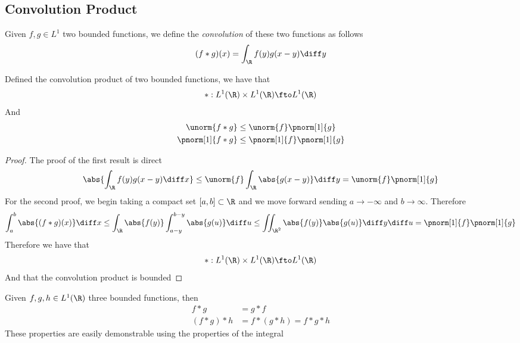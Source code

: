 \documentclass[../mmf.tex]{subfiles}
\begin{document}
\subsection{Convolution Product}
\begin{dfn}
	Given $f,g\in L^1$ two bounded functions, we define the \textit{convolution} of these two functions as follows
	\begin{equation}
		(f*g)(x)=\int_{\R}^{}f(y)g(x-y)\diff y
		\label{eq:convolution}
	\end{equation}
\end{dfn}
\begin{thm}
	Defined the convolution product of two bounded functions, we have that
	\begin{equation*}
		*:L^1(\R)\times L^1(\R)\fto L^1(\R)
	\end{equation*}
	And
	\begin{equation*}
		\begin{aligned}
			\unorm{f*g}&\le\unorm{f}\pnorm[1]{g}\\
			\pnorm[1]{f*g}&\le\pnorm[1]{f}\pnorm[1]{g}
		\end{aligned}
	\end{equation*}
\end{thm}
\begin{proof}
	The proof of the first result is direct
	\begin{equation*}
		\abs{\int_{\R}^{}f(y)g(x-y)\diff x}\le\unorm{f}\int_{\R}^{}\abs{g(x-y)}\diff y=\unorm{f}\pnorm[1]{g}
	\end{equation*}
	For the second proof, we begin taking a compact set $[a,b]\subset\R$ and we move forward sending $a\to-\infty$ and $b\to\infty$. Therefore
	\begin{equation*}
		\int_{a}^{b}\abs{(f*g)(x)}\diff x\le\int_{\R}^{}\abs{f(y)}\int_{a-y}^{b-y}\abs{g(u)}\diff u\le\iint_{\R^2}\abs{f(y)}\abs{g(u)}\diff y\diff u=\pnorm[1]{f}\pnorm[1]{g}
	\end{equation*}
	Therefore we have that
	\begin{equation*}
		*:L^1(\R)\times L^1(\R)\fto L^1(\R)
	\end{equation*}
	And that the convolution product is bounded
\end{proof}
\begin{thm}
	Given $f,g,h\in L^1(\R)$ three bounded functions, then
	\begin{equation}
		\begin{aligned}
			f*g&=g*f\\
			(f*g)*h&=f*(g*h)=f*g*h
		\end{aligned}
		\label{eq:propertiesconv}
	\end{equation}
	These properties are easily demonstrable using the properties of the integral
\end{thm}
\end{document}
